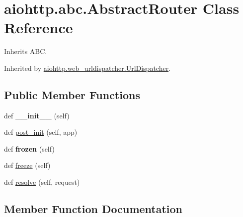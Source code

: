 \hypertarget{classaiohttp_1_1abc_1_1_abstract_router}{}\section{aiohttp.\+abc.\+Abstract\+Router Class Reference}
\label{classaiohttp_1_1abc_1_1_abstract_router}


Inherits A\+BC.



Inherited by \hyperlink{classaiohttp_1_1web__urldispatcher_1_1_url_dispatcher}{aiohttp.\+web\+\_\+urldispatcher.\+Url\+Dispatcher}.

\subsection*{Public Member Functions}
\begin{DoxyCompactItemize}
\item 
\mbox{\label{classaiohttp_1_1abc_1_1_abstract_router_aecb194211a31b7286b12461e2997dfcb}} 
def {\bfseries \+\_\+\+\_\+init\+\_\+\+\_\+} (self)
\item 
def \hyperlink{classaiohttp_1_1abc_1_1_abstract_router_a4617de1de36ba4396682fe5c072e2ccc}{post\+\_\+init} (self, app)
\item 
\mbox{\label{classaiohttp_1_1abc_1_1_abstract_router_abc826a9e59d1d2db478bfc0cca708f39}} 
def {\bfseries frozen} (self)
\item 
def \hyperlink{classaiohttp_1_1abc_1_1_abstract_router_a0cca560179ccce34ca27d563d1043630}{freeze} (self)
\item 
def \hyperlink{classaiohttp_1_1abc_1_1_abstract_router_a50eaa0cfafcd573b9d60a2a59ba0e00e}{resolve} (self, request)
\end{DoxyCompactItemize}


\subsection{Member Function Documentation}
\mbox{\label{classaiohttp_1_1abc_1_1_abstract_router_a0cca560179ccce34ca27d563d1043630}} 

